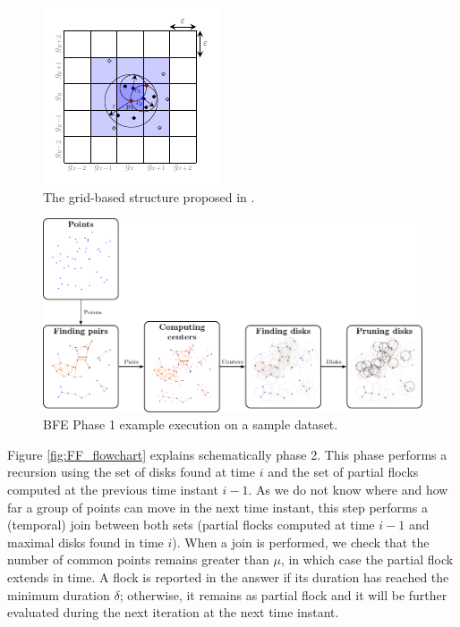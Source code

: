 \begin{figure}
    \centering
    \includegraphics[width=0.5\linewidth]{chapterPFlocks/figures/grid_prime}
    \caption{The grid-based structure proposed in \cite{vieira_2009}.}\label{fig:grid}
\end{figure}

\begin{figure}
    \centering
    \includegraphics[width=\linewidth]{chapterPFlocks/figures/MF_stages2/flow}
    \caption{BFE Phase 1 example execution on a sample dataset.}\label{fig:MF_stages}
\end{figure}

Figure \ref{fig:FF_flowchart} explains schematically phase 2. This phase performs a recursion using the set of disks found at time $i$ and the set of partial 
flocks computed at the  previous time instant $i-1$.  As we do not know where and how far a group of points can move in the next time instant, this step 
performs a (temporal) join between both sets (partial flocks computed at time $i-1$ and maximal disks found in time $i$).  When a join is performed, we check 
that the number of common points remains greater than $\mu$, in which case the partial flock extends in time. A flock is reported in the answer if its duration 
has reached the minimum duration $\delta$; otherwise, it remains as partial flock and it will be further evaluated during the next iteration at the next time 
instant.

